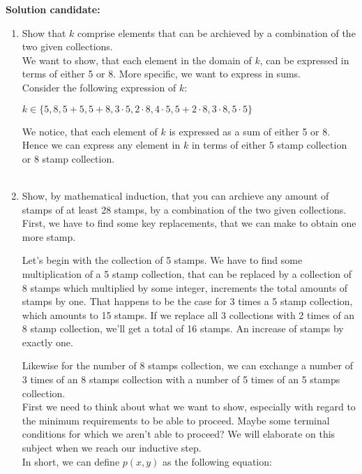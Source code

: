 \documentclass{report}
\newcommand{\cent}[1]{\begin{center}#1\end{center}}
\newcommand{\In}{\! \in \!}
\newcommand{\solution}{\textbf{Solution candidate: }}
\newcommand{\QED}{\boxed{}}
\newcommand{\defaultEnumerateLabel}{\textbf{\alph*.}}
\newcommand{\myItem}[1]{\item #1\\}
\begin{document}
 	\solution
 	\begin{enumerate}[label=\defaultEnumerateLabel]
 		\myItem{Show that $k$ comprise elements that can be archieved by a combination of the two given collections.}
 		
 		We want to show, that each element in the domain of $k$, can be expressed in terms of either 5 or 8. More specific, we want to express in sums.\\
 		
 		Consider the following expression of $k$:
 		
 		\cent{$k \In \{5,8,5 + 5,5+8,3 \cdot 5,2 \cdot 8,4 \cdot 5,5+ 2 \cdot 8,3 \cdot 8,5 \cdot 5\}$}
 		
 		We notice, that each element of $k$ is expressed as a sum of either 5 or 8. Hence we can express any element in $k$ in terms of either 5 stamp collection or 8 stamp collection.\\
 		\QED\\
 		
 		\myItem{Show, by mathematical induction, that you can archieve any amount of stamps of at least 28 stamps, by a combination of the two given collections.}
 		
 		First, we have to find some key replacements, that we can make to obtain one more stamp.
 		
 		Let's begin with the collection of 5 stamps. We have to find some multiplication of a 5 stamp collection, that can be replaced by a collection of 8 stamps which multiplied by some integer, increments the total amounts of stamps by one. That happens to be the case for 3 times a 5 stamp collection, which amounts to 15 stamps. If we replace all 3 collections with 2 times of an 8 stamp collection, we'll get a total of 16 stamps. An increase of stamps by exactly one. 
 		
 		Likewise for the number of 8 stamps collection, we can exchange a number of 3 times of an 8 stamps collection with a number of 5 times of an 5 stamps collection.\\
 		
 		First we need to think about what we want to show, especially with regard to the minimum requirements to be able to proceed. Maybe some terminal conditions for which we aren't able to proceed? We will elaborate on this subject when we reach our inductive step.\\
 		
 		In short, we can define $p(x,y)$ as the following equation:
 		

\end{enumerate}
\end{document}
